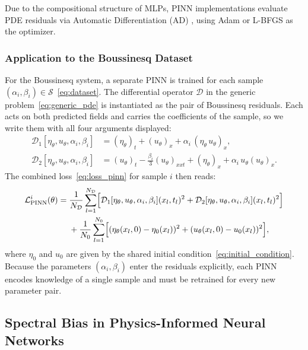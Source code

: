Due to the compositional structure of MLPs, PINN implementations evaluate PDE residuals via Automatic Differentiation (AD) \parencite{linnainmaa1970, paszke2019pytorch}, using Adam \parencite{kingma2014adam} or L-BFGS \parencite{nocedal1980lbfgs} as the optimizer.

\subsubsection{Application to the Boussinesq Dataset}
\label{subsubsec:pinn_loss_boussinesq}

For the Boussinesq system, a separate PINN is trained for each sample $(\alpha_i,\beta_i) \in \mathcal{S}$~\eqref{eq:dataset}. The differential operator $\mathcal{D}$ in the generic problem~\eqref{eq:generic_pde} is instantiated as the pair of Boussinesq residuals. Each acts on both predicted fields and carries the coefficients of the sample, so we write them with all four arguments displayed:
\begin{align*}
    \mathcal{D}_1[\eta_\theta, u_\theta, \alpha_i, \beta_i] &= (\eta_\theta)_t + (u_\theta)_x + \alpha_i\,(\eta_\theta\,u_\theta)_x, \\
    \mathcal{D}_2[\eta_\theta, u_\theta, \alpha_i, \beta_i] &= (u_\theta)_t - \tfrac{\beta_i}{3}(u_\theta)_{xxt} + (\eta_\theta)_x + \alpha_i\,u_\theta(u_\theta)_x.
\end{align*}
The combined loss~\eqref{eq:loss_pinn} for sample $i$ then reads:
\begin{equation}\label{eq:pinn_loss_boussinesq}
    \begin{aligned}
        \mathcal{L}^{i}_{\text{PINN}}(\theta) ={}
        & \frac{1}{N_\mathcal{D}}\sum_{l=1}^{N_\mathcal{D}}
        \Bigl[\mathcal{D}_1[\eta_\theta, u_\theta, \alpha_i, \beta_i](x_l,t_l)^2 + \mathcal{D}_2[\eta_\theta, u_\theta, \alpha_i, \beta_i](x_l,t_l)^2\Bigr] \\
        & + \frac{1}{N_0}\sum_{l=1}^{N_0}
        \Bigl[(\eta_\theta(x_l,0)-\eta_0(x_l))^2 + (u_\theta(x_l,0)-u_0(x_l))^2\Bigr],
    \end{aligned}
\end{equation}
where $\eta_0$ and $u_0$ are given by the shared initial condition~\eqref{eq:initial_condition}. Because the parameters $(\alpha_i,\beta_i)$ enter the residuals explicitly, each PINN encodes knowledge of a single sample and must be retrained for every new parameter pair.

\subsection{Spectral Bias in Physics-Informed Neural Networks}
\label{subsec:ntk_pinn}

